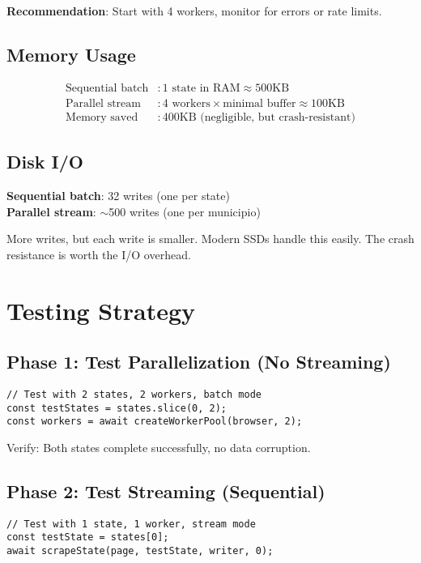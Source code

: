 \documentclass[11pt,a4paper]{article}
\begin{document}
\textbf{Recommendation}: Start with 4 workers, monitor for errors or rate limits.

\subsection{Memory Usage}

\begin{align*}
\text{Sequential batch} &: \text{1 state in RAM} \approx 500\text{KB} \\
\text{Parallel stream} &: \text{4 workers} \times \text{minimal buffer} \approx 100\text{KB} \\
\text{Memory saved} &: 400\text{KB} \text{ (negligible, but crash-resistant)}
\end{align*}

\subsection{Disk I/O}

\textbf{Sequential batch}: 32 writes (one per state) \\
\textbf{Parallel stream}: $\sim$500 writes (one per municipio)

More writes, but each write is smaller. Modern SSDs handle this easily. The crash resistance is worth the I/O overhead.

\section{Testing Strategy}

\subsection{Phase 1: Test Parallelization (No Streaming)}

\begin{lstlisting}
// Test with 2 states, 2 workers, batch mode
const testStates = states.slice(0, 2);
const workers = await createWorkerPool(browser, 2);
\end{lstlisting}

Verify: Both states complete successfully, no data corruption.

\subsection{Phase 2: Test Streaming (Sequential)}

\begin{lstlisting}
// Test with 1 state, 1 worker, stream mode
const testState = states[0];
await scrapeState(page, testState, writer, 0);
\end{lstlisting}
\end{document}
